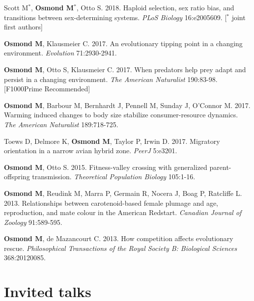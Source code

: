 \documentclass[12pt]{article}
\begin{document}
\begin{etaremune}
  \item Scott M$^*$, \textbf{Osmond M}$^*$, Otto S. 2018. Haploid selection, sex ratio bias, and transitions between sex-determining systems. \textit{PLoS Biology} 16:e2005609. [$^*$ joint first authors]
  \item \textbf{Osmond M}, Klausmeier C. 2017. An evolutionary tipping point in a changing environment. \textit{Evolution} 71:2930-2941.
  \item \textbf{Osmond M}, Otto S, Klausmeier C. 2017. When predators help prey adapt and persist in a changing environment. \textit{The American Naturalist} 190:83-98. [F1000Prime Recommended]
  \item \textbf{Osmond M}, Barbour M, Bernhardt J, Pennell M, Sunday J, O'Connor M. 2017. Warming induced changes to body size stabilize consumer-resource dynamics. \textit{The American Naturalist} 189:718-725.
  \item Toews D, Delmore K, \textbf{Osmond M}, Taylor P, Irwin D. 2017. Migratory orientation in a narrow avian hybrid zone. \textit{PeerJ} 5:e3201.
  \item \textbf{Osmond M}, Otto S. 2015. Fitness-valley crossing with generalized parent-offspring transmission. \textit{Theoretical Population Biology} 105:1-16. %
  \item \textbf{Osmond M}, Reudink M, Marra P, Germain R, Nocera J,  Boag P, Ratcliffe L.  2013. Relationships between carotenoid-based female plumage and age, reproduction, and mate colour in the American Redstart. \textit{Canadian Journal of Zoology} 91:589-595. %
  \item \textbf{Osmond M}, de Mazancourt C. 2013. How competition affects evolutionary rescue. \textit{Philosophical Transactions of the Royal Society B: Biological Sciences} 368:20120085. %
\end{etaremune}

\section*{Invited talks}
\end{document}
